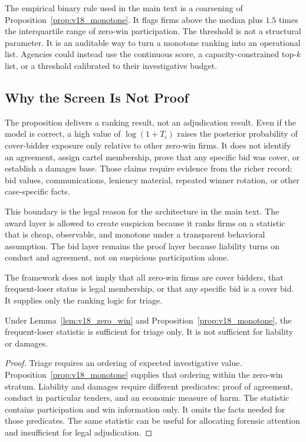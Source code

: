 The empirical binary rule used in the main text is a coarsening
of Proposition~\ref{prop:v18_monotone}. It flags firms above the
median plus $1.5$ times the interquartile range of zero-win
participation. The threshold is not a structural parameter. It
is an auditable way to turn a monotone ranking into an
operational list. Agencies could instead use the continuous
score, a capacity-constrained top-$k$ list, or a threshold
calibrated to their investigative budget.

\subsection{Why the Screen Is Not Proof}
\label{app:framework_scope}

The proposition delivers a ranking result, not an adjudication
result. Even if the model is correct, a high value of
$\log(1+T_i)$ raises the posterior probability of cover-bidder
exposure only relative to other zero-win firms. It does not
identify an agreement, assign cartel membership, prove that any
specific bid was cover, or establish a damages base. Those
claims require evidence from the richer record: bid values,
communications, leniency material, repeated winner rotation, or
other case-specific facts.

This boundary is the legal reason for the architecture in the
main text. The award layer is allowed to create suspicion because
it ranks firms on a statistic that is cheap, observable, and
monotone under a transparent behavioral assumption. The bid layer
remains the proof layer because liability turns on conduct and
agreement, not on suspicious participation alone.

The framework does not imply that all zero-win firms are cover
bidders, that frequent-loser status is legal membership, or that
any specific bid is a cover bid. It supplies only the ranking
logic for triage.

\begin{proposition}
\label{prop:v18_scope}
Under Lemma~\ref{lem:v18_zero_win} and
Proposition~\ref{prop:v18_monotone}, the frequent-loser statistic
is sufficient for triage only. It is not sufficient for liability
or damages.
\end{proposition}

\begin{proof}
Triage requires an ordering of expected investigative value.
Proposition~\ref{prop:v18_monotone} supplies that ordering
within the zero-win stratum. Liability and damages require
different predicates: proof of agreement, conduct in particular
tenders, and an economic measure of harm. The statistic contains
participation and win information only. It omits the facts needed
for those predicates. The same statistic can be useful for
allocating forensic attention and insufficient for legal
adjudication.
\end{proof}
